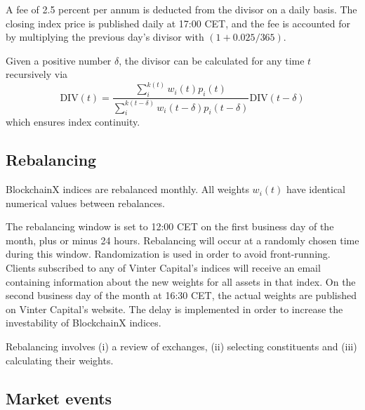 \documentclass{article}
\begin{document}
A fee of 2.5 percent per annum is deducted from the divisor on a daily basis. The closing index price is published daily at 17:00 CET, and the fee is accounted for by multiplying the previous day's divisor with $(1 + 0.025/365)$.

Given a positive number $\delta$, the divisor can be calculated for any time $t$ recursively via
\begin{equation}
  \text{DIV}(t) 
  = \frac{\sum_{i}^{k(t)}
    w_{i}(t)p_{i}(t)}{\sum_{i}^{k(t-\delta)}
    w_{i}(t-\delta)p_{i}(t-\delta)} 
    \text{DIV}(t-\delta)
\label{eq:divisor}
\end{equation}
which ensures index continuity. 
\subsection{Rebalancing}

BlockchainX indices are rebalanced monthly. All weights $w_i(t)$ have identical numerical values between rebalances. 

The rebalancing window is set to 12:00 CET on the first business day of the month, plus or minus 24 hours. 
Rebalancing will occur at a randomly chosen time during this window. 
Randomization is used in order to avoid front-running. 
Clients subscribed to any of Vinter Capital's indices will receive an email containing information about the new weights for all assets in that index.
On the second business day of the month at 16:30 CET, the actual weights are published on Vinter Capital's website. The delay is implemented in order to increase the investability of BlockchainX indices.

Rebalancing involves 
(i) a review of exchanges,
(ii) selecting constituents  
and (iii) calculating their weights.


\subsection{Market events}

\end{document}

